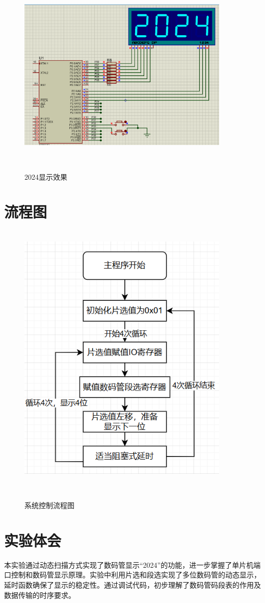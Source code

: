 \documentclass[12pt,hyperref,a4paper,UTF8]{ctexart}
\begin{document}
\begin{figure}[H] %
    \centering
    \includegraphics[width=0.9\textwidth]{figures/201.png} %
    \caption{2024显示效果 } %
    \label{fig:example} %
\end{figure}


\section{流程图}


\begin{figure}[H] %
        \centering
        \includegraphics[width=0.9\textwidth]{figures/301.png} %
        \caption{系统控制流程图} %
        \label{fig:example} %
\end{figure}



\section{实验体会}


本实验通过动态扫描方式实现了数码管显示“2024”的功能，进一步掌握了单片机端口控制和数码管显示原理。实验中利用片选和段选实现了多位数码管的动态显示，延时函数确保了显示的稳定性。通过调试代码，初步理解了数码管码段表的作用及数据传输的时序要求。
\end{document}
